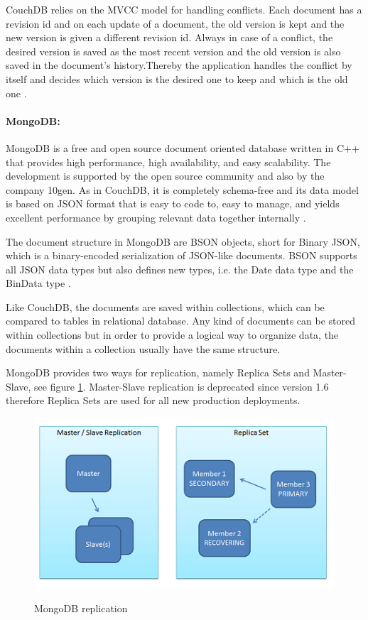 CouchDB relies on the \ac{MVCC} model for handling conflicts. Each document has a revision id and on each update of a document, the old version is kept and the new version is given a different revision id. Always in case of a conflict, the desired version is saved as the most recent version and the old version is also saved in the document's history.Thereby the application handles the conflict by itself and decides which version is the desired one to keep and which is the old one \cite{books/daglib/0024051}.

\paragraph{MongoDB:\label{sec:back_mongo}}
MongoDB is a free and open source document oriented database written in C++ that provides high performance, high availability, and easy scalability. The development is supported by the open source community and also by the company 10gen. As in CouchDB, it is completely schema-free and its data model is based on \ac{JSON} format  that is easy to code to, easy to manage, and yields excellent performance by grouping relevant data together internally \cite{mongodb_intro}. 

The document structure in MongoDB are BSON objects, short for Binary \ac{JSON}, which is a binary-encoded serialization of \ac{JSON}-like documents.  \ac{BSON} supports all \ac{JSON} data types but also defines new types, i.e. the Date data type and the BinData type \cite{bson_intro}.

Like CouchDB, the documents are saved within collections, which can be compared to tables in relational database. Any kind of documents can be stored within collections but in order to provide a logical way to organize data, the documents within a collection usually have the same structure.

MongoDB provides two ways for replication, namely Replica Sets and Master-Slave, see figure \ref{fig:mongodb_repl}. Master-Slave replication is deprecated since version 1.6 therefore Replica Sets are used for all new production deployments.

\begin{figure}[htb]
  \centering
  \includegraphics{mongodb_repl.png}\\
  \caption{MongoDB replication}
  \label{fig:mongodb_repl}
  \protect\cite{mongodb_replication}
\end{figure}

